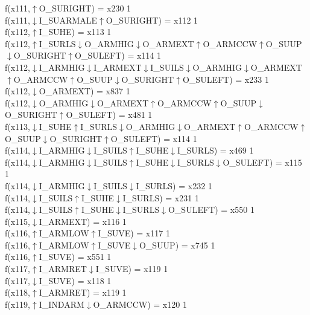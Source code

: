 f(x111,$\uparrow$O\_SURIGHT) = x230 {1} \\
f(x111,$\downarrow$I\_SUARMALE$\uparrow$O\_SURIGHT) = x112 {1} \\
f(x112,$\uparrow$I\_SUHE) = x113 {1} \\
f(x112,$\uparrow$I\_SURLS$\downarrow$O\_ARMHIG$\downarrow$O\_ARMEXT$\uparrow$O\_ARMCCW$\uparrow$O\_SUUP$\downarrow$O\_SURIGHT$\uparrow$O\_SULEFT) = x114 {1} \\
f(x112,$\downarrow$I\_ARMHIG$\downarrow$I\_ARMEXT$\downarrow$I\_SUILS$\downarrow$O\_ARMHIG$\downarrow$O\_ARMEXT$\uparrow$O\_ARMCCW$\uparrow$O\_SUUP$\downarrow$O\_SURIGHT$\uparrow$O\_SULEFT) = x233 {1} \\
f(x112,$\downarrow$O\_ARMEXT) = x837 {1} \\
f(x112,$\downarrow$O\_ARMHIG$\downarrow$O\_ARMEXT$\uparrow$O\_ARMCCW$\uparrow$O\_SUUP$\downarrow$O\_SURIGHT$\uparrow$O\_SULEFT) = x481 {1} \\
f(x113,$\downarrow$I\_SUHE$\uparrow$I\_SURLS$\downarrow$O\_ARMHIG$\downarrow$O\_ARMEXT$\uparrow$O\_ARMCCW$\uparrow$O\_SUUP$\downarrow$O\_SURIGHT$\uparrow$O\_SULEFT) = x114 {1} \\
f(x114,$\downarrow$I\_ARMHIG$\downarrow$I\_SUILS$\uparrow$I\_SUHE$\downarrow$I\_SURLS) = x469 {1} \\
f(x114,$\downarrow$I\_ARMHIG$\downarrow$I\_SUILS$\uparrow$I\_SUHE$\downarrow$I\_SURLS$\downarrow$O\_SULEFT) = x115 {1} \\
f(x114,$\downarrow$I\_ARMHIG$\downarrow$I\_SUILS$\downarrow$I\_SURLS) = x232 {1} \\
f(x114,$\downarrow$I\_SUILS$\uparrow$I\_SUHE$\downarrow$I\_SURLS) = x231 {1} \\
f(x114,$\downarrow$I\_SUILS$\uparrow$I\_SUHE$\downarrow$I\_SURLS$\downarrow$O\_SULEFT) = x550 {1} \\
f(x115,$\downarrow$I\_ARMEXT) = x116 {1} \\
f(x116,$\uparrow$I\_ARMLOW$\uparrow$I\_SUVE) = x117 {1} \\
f(x116,$\uparrow$I\_ARMLOW$\uparrow$I\_SUVE$\downarrow$O\_SUUP) = x745 {1} \\
f(x116,$\uparrow$I\_SUVE) = x551 {1} \\
f(x117,$\uparrow$I\_ARMRET$\downarrow$I\_SUVE) = x119 {1} \\
f(x117,$\downarrow$I\_SUVE) = x118 {1} \\
f(x118,$\uparrow$I\_ARMRET) = x119 {1} \\
f(x119,$\uparrow$I\_INDARM$\downarrow$O\_ARMCCW) = x120 {1} \\
